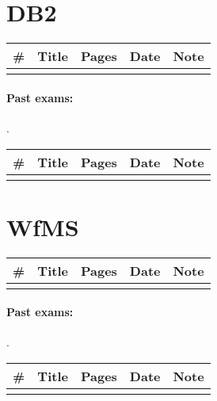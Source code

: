 \documentclass[a4paper,12pt]{article} %
\begin{document}
\newpage
\section{DB2}
\begin{tabularx}{\textwidth}{|l|X|c|l|c|}
	\hline
	\# & Title & Pages & Date & Note \\
	\hline
	&  &  &  &  \\
	\hline
\end{tabularx}

\paragraph{Past exams:}.\\
\begin{tabularx}{\textwidth}{|l|X|c|l|c|}
	\hline
	\# & Title & Pages & Date & Note \\
	\hline
	&  &  &  &  \\
	\hline
\end{tabularx}

\newpage
\section{WfMS}
\begin{tabularx}{\textwidth}{|l|X|c|l|c|}
	\hline
	\# & Title & Pages & Date & Note \\
	\hline
	&  &  &  &  \\
	\hline
\end{tabularx}

\paragraph{Past exams:}.\\
\begin{tabularx}{\textwidth}{|l|X|c|l|c|}
	\hline
	\# & Title & Pages & Date & Note \\
	\hline
	&  &  &  &  \\
	\hline
\end{tabularx}

\newpage
\end{document}

